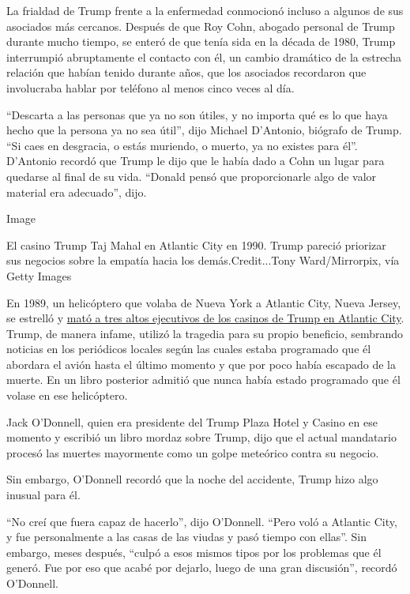 La frialdad de Trump frente a la enfermedad conmocionó incluso a algunos
de sus asociados más cercanos. Después de que Roy Cohn, abogado personal
de Trump durante mucho tiempo, se enteró de que tenía sida en la década
de 1980, Trump interrumpió abruptamente el contacto con él, un cambio
dramático de la estrecha relación que habían tenido durante años, que
los asociados recordaron que involucraba hablar por teléfono al menos
cinco veces al día.

``Descarta a las personas que ya no son útiles, y no importa qué es lo
que haya hecho que la persona ya no sea útil'', dijo Michael D'Antonio,
biógrafo de Trump. ``Si caes en desgracia, o estás muriendo, o muerto,
ya no existes para él''. D'Antonio recordó que Trump le dijo que le
había dado a Cohn un lugar para quedarse al final de su vida. ``Donald
pensó que proporcionarle algo de valor material era adecuado'', dijo.

Image

El casino Trump Taj Mahal en Atlantic City en 1990. Trump pareció
priorizar sus negocios sobre la empatía hacia los demás.Credit...Tony
Ward/Mirrorpix, vía Getty Images

En 1989, un helicóptero que volaba de Nueva York a Atlantic City, Nueva
Jersey, se estrelló y
\href{https://www.nytimes3xbfgragh.onion/1989/10/11/nyregion/copter-crash-kills-3-aides-of-trump.html}{mató
a tres altos ejecutivos de los casinos de Trump en Atlantic City}.
Trump, de manera infame, utilizó la tragedia para su propio beneficio,
sembrando noticias en los periódicos locales según las cuales estaba
programado que él abordara el avión hasta el último momento y que por
poco había escapado de la muerte. En un libro posterior admitió que
nunca había estado programado que él volase en ese helicóptero.

Jack O'Donnell, quien era presidente del Trump Plaza Hotel y Casino en
ese momento y escribió un libro mordaz sobre Trump, dijo que el actual
mandatario procesó las muertes mayormente como un golpe meteórico contra
su negocio.

Sin embargo, O'Donnell recordó que la noche del accidente, Trump hizo
algo inusual para él.

``No creí que fuera capaz de hacerlo'', dijo O'Donnell. ``Pero voló a
Atlantic City, y fue personalmente a las casas de las viudas y pasó
tiempo con ellas''. Sin embargo, meses después, ``culpó a esos mismos
tipos por los problemas que él generó. Fue por eso que acabé por
dejarlo, luego de una gran discusión'', recordó O'Donnell.

